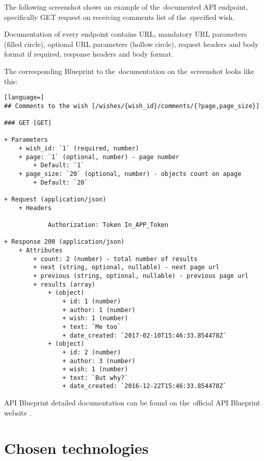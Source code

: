The following screenshot shows an example of the~documented \ac{API} end\-point, specifically GET request on receiving
comments list of the~specified wish.

\pagebreak

Documentation of every endpoint contains \ac{URL}, mandatory \ac{URL} parameters (filled circle), optional \ac{URL}
parameters (hollow circle), request headers and body format if required, response headers and body format.

The corresponding Blueprint to the~documentation on the~screenshot looks like this:

\begin{lstlisting}[language=]
## Comments to the wish [/wishes/{wish_id}/comments/{?page,page_size}]

### GET [GET]

+ Parameters
    + wish_id: `1` (required, number)
    + page: `1` (optional, number) - page number
        + Default: `1`
    + page_size: `20` (optional, number) - objects count on apage
        + Default: `20`

+ Request (application/json)
    + Headers

            Authorization: Token In_APP_Token

+ Response 200 (application/json)
    + Attributes
        + count: 2 (number) - total number of results
        + next (string, optional, nullable) - next page url
        + previous (string, optional, nullable) - previous page url
        + results (array)
            + (object)
                + id: 1 (number)
                + author: 1 (number)
                + wish: 1 (number)
                + text: `Me too`
                + date_created: `2017-02-10T15:46:33.854478Z`
            + (object)
                + id: 2 (number)
                + author: 3 (number)
                + wish: 1 (number)
                + text: `But why?`
                + date_created: `2016-12-22T15:46:33.854478Z`
\end{lstlisting}

API Blueprint detailed documentation can be found on the~official API Blueprint website \cite{apiblueprint}.



\section{Chosen technologies}

